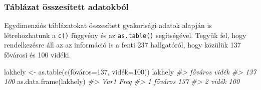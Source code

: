 \documentclass[
]{book}
\newenvironment{Shaded}{\begin{snugshade}}{\end{snugshade}}
\newcommand{\AttributeTok}[1]{\textcolor[rgb]{0.77,0.63,0.00}{#1}}
\newcommand{\CommentTok}[1]{\textcolor[rgb]{0.56,0.35,0.01}{\textit{#1}}}
\newcommand{\DecValTok}[1]{\textcolor[rgb]{0.00,0.00,0.81}{#1}}
\newcommand{\FunctionTok}[1]{\textcolor[rgb]{0.00,0.00,0.00}{#1}}
\newcommand{\NormalTok}[1]{#1}
\newcommand{\OtherTok}[1]{\textcolor[rgb]{0.56,0.35,0.01}{#1}}
\newcommand{\SpecialCharTok}[1]{\textcolor[rgb]{0.00,0.00,0.00}{#1}}
\newcommand{\StringTok}[1]{\textcolor[rgb]{0.31,0.60,0.02}{#1}}
\begin{document}
\begin{Shaded}
\end{Shaded}

\hypertarget{tuxe1bluxe1zat-uxf6sszesuxedtett-adatokbuxf3l}{%
\subsubsection{Táblázat összesített adatokból}\label{tuxe1bluxe1zat-uxf6sszesuxedtett-adatokbuxf3l}}

Egydimenziós táblázatokat összesített gyakorisági adatok alapján is létrehozhatunk a \texttt{c()} függvény és az \texttt{as.table()} segítségével. Tegyük fel, hogy rendelkezésre áll az az információ is a fenti 237 hallgatóról, hogy közülük 137 fővárosi és 100 vidéki.

\begin{Shaded}
\begin{Highlighting}[]
\NormalTok{lakhely }\OtherTok{\textless{}{-}} \FunctionTok{as.table}\NormalTok{(}\FunctionTok{c}\NormalTok{(főváros}\OtherTok{=}\DecValTok{137}\NormalTok{, vidék}\OtherTok{=}\DecValTok{100}\NormalTok{))}
\NormalTok{lakhely}
\CommentTok{\#\textgreater{} főváros   vidék }
\CommentTok{\#\textgreater{}     137     100}
\FunctionTok{as.data.frame}\NormalTok{(lakhely)}
\CommentTok{\#\textgreater{}      Var1 Freq}
\CommentTok{\#\textgreater{} 1 főváros  137}
\CommentTok{\#\textgreater{} 2   vidék  100}
\end{Highlighting}
\end{Shaded}
\end{document}
